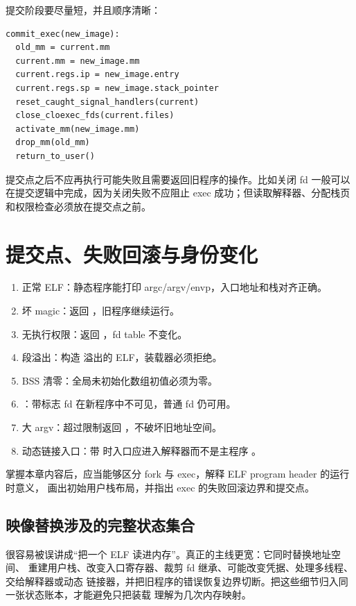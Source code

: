 提交阶段要尽量短，并且顺序清晰：

\begin{lstlisting}
commit_exec(new_image):
  old_mm = current.mm
  current.mm = new_image.mm
  current.regs.ip = new_image.entry
  current.regs.sp = new_image.stack_pointer
  reset_caught_signal_handlers(current)
  close_cloexec_fds(current.files)
  activate_mm(new_image.mm)
  drop_mm(old_mm)
  return_to_user()
\end{lstlisting}

提交点之后不应再执行可能失败且需要返回旧程序的操作。比如关闭  fd 一般可以在提交逻辑中完成，因为关闭失败不应阻止 exec 成功；但读取解释器、分配栈页和权限检查必须放在提交点之前。

\section{提交点、失败回滚与身份变化}

\begin{enumerate}
\tightlist
\item 正常 ELF：静态程序能打印 argc/argv/envp，入口地址和栈对齐正确。
\item 坏 magic：返回 ，旧程序继续运行。
\item 无执行权限：返回 ，fd table 不变化。
\item 段溢出：构造  溢出的 ELF，装载器必须拒绝。
\item BSS 清零：全局未初始化数组初值必须为零。
\item {}：带标志 fd 在新程序中不可见，普通 fd 仍可用。
\item 大 argv：超过限制返回 ，不破坏旧地址空间。
\item 动态链接入口：带  时入口应进入解释器而不是主程序 。
\end{enumerate}

\begin{rubricbox}
掌握本章内容后，应当能够区分 fork 与 exec，解释 ELF program header 的运行时意义，
画出初始用户栈布局，并指出 exec 的失败回滚边界和提交点。
\end{rubricbox}

\subsection{映像替换涉及的完整状态集合}

 很容易被误讲成“把一个 ELF 读进内存”。真正的主线更宽：它同时替换地址空间、
重建用户栈、改变入口寄存器、裁剪 fd 继承、可能改变凭据、处理多线程、交给解释器或动态
链接器，并把旧程序的错误恢复边界切断。把这些细节归入同一张状态账本，才能避免只把装载
理解为几次内存映射。

